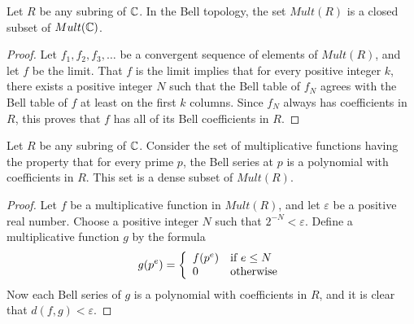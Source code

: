 


\begin{proposition}
Let $R$ be any subring of $\mathbb{C}$. In the Bell topology, the set $Mult(R)$ is a closed subset of $Mult(\mathbb{C})$.
\end{proposition}
\begin{proof}
Let $f_1, f_2, f_3, \ldots$ be a convergent sequence of elements of $Mult(R)$, and let $f$ be the limit. That $f$ is the limit implies that for every positive integer $k$, there exists a positive integer $N$ such that the Bell table of $f_N$ agrees with the Bell table of $f$ at least on the first $k$ columns. Since $f_N$ always has coefficients in $R$, this proves that $f$ has all of its Bell coefficients in $R$. 
\end{proof}


\begin{proposition}
Let $R$ be any subring of $\mathbb{C}$. Consider the set of multiplicative functions having the property that for every prime $p$, the Bell series at $p$ is a polynomial with coefficients in $R$. This set is a dense subset of $Mult(R)$. 
\end{proposition}


\begin{proof}
Let $f$ be a multiplicative function in $Mult(R)$, and let $\varepsilon$ be a positive real number. Choose a positive integer $N$ such that $2^{-N} < \varepsilon$. Define a multiplicative function $g$ by the formula
$$ g(p^e) = \left\{ \begin{array}{ll}  f(p^e)  & \mbox{if } e  \leq N   \\ 0 & \mbox{} \textrm{otherwise} \end{array} \right.$$
Now each Bell series of $g$ is a polynomial with coefficients in $R$, and it is clear that $d(f, g) < \varepsilon$.
\end{proof}

